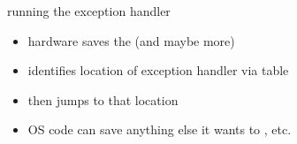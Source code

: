 
\begin{frame}[fragile,label=exceptHandlerRun]{running the exception handler}
\begin{itemize}
    \item hardware saves the  (and maybe more)
    \item identifies location of exception handler via table
    \item then jumps to that location
    \vspace{.5cm}
    \item OS code can save anything else it wants to , etc.
\end{itemize}
\end{frame}


